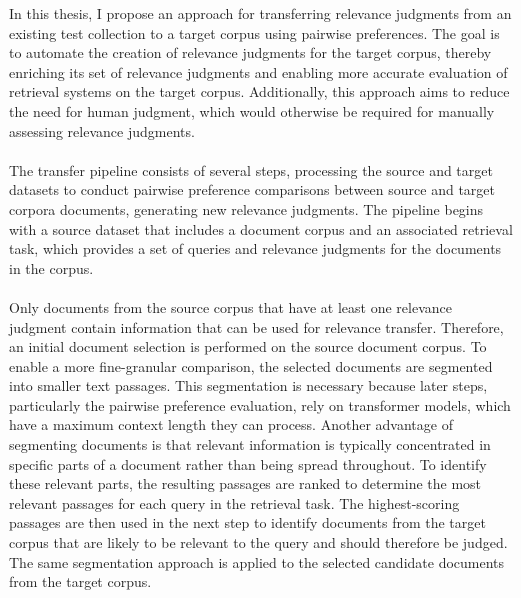 In this thesis, I propose an approach for transferring relevance judgments from an existing test collection to a target corpus using pairwise preferences. The goal is to automate the creation of relevance judgments for the target corpus, thereby enriching its set of relevance judgments and enabling more accurate evaluation of retrieval systems on the target corpus. Additionally, this approach aims to reduce the need for human judgment, which would otherwise be \mbox{required} for manually assessing relevance judgments.
\\\\
The transfer pipeline consists of several steps, processing the source and target datasets to conduct pairwise preference comparisons between source and target corpora documents, generating new relevance judgments. The pipeline begins with a source dataset that includes a document corpus and an associated retrieval task, which provides a set of queries and relevance judgments for the documents in the corpus.
\\\\
Only documents from the source corpus that have at least one relevance judgment contain information that can be used for relevance transfer. Therefore, an initial document selection is performed on the source document corpus. To enable a more fine-granular comparison, the selected documents are segmented into smaller text passages. This segmentation is necessary because later steps, particularly the pairwise preference evaluation, rely on transformer models, which have a maximum context length they can process. Another advantage of segmenting documents is that relevant information is typically concentrated in specific parts of a document rather than being spread throughout. To identify these relevant parts, the resulting passages are ranked to determine the most relevant passages for each query in the retrieval task. The highest-scoring passages are then used in the next step to identify documents from the target corpus that are likely to be relevant to the query and should therefore be judged. The same segmentation approach is applied to the selected candidate documents from the target corpus.
